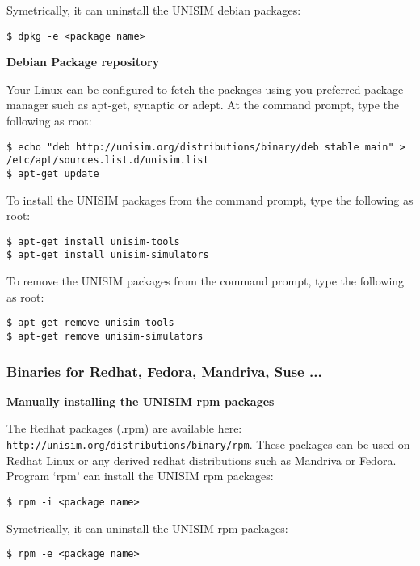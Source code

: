 Symetrically, it can uninstall the UNISIM debian packages:

\begin{verbatim}
$ dpkg -e <package name>
\end{verbatim}

\noindent \textbf{Debian Package repository}

Your Linux can be configured to fetch the packages using you preferred package manager such as apt-get, synaptic or adept.
At the command prompt, type the following as root:

\begin{verbatim}
$ echo "deb http://unisim.org/distributions/binary/deb stable main" > /etc/apt/sources.list.d/unisim.list
$ apt-get update
\end{verbatim}

To install the UNISIM packages from the command prompt, type the following as root:

\begin{verbatim}
$ apt-get install unisim-tools
$ apt-get install unisim-simulators
\end{verbatim}

To remove the UNISIM packages from the command prompt, type the following as root:

\begin{verbatim}
$ apt-get remove unisim-tools
$ apt-get remove unisim-simulators
\end{verbatim}

\subsubsection{Binaries for Redhat, Fedora, Mandriva, Suse ...}

\noindent \textbf{Manually installing the UNISIM rpm packages}

The Redhat packages (.rpm) are available here: \texttt{http://unisim.org/distributions/binary/rpm}.
These packages can be used on Redhat Linux or any derived redhat distributions such as Mandriva or Fedora.
Program ‘rpm’ can install the UNISIM rpm packages:

\begin{verbatim}
$ rpm -i <package name>
\end{verbatim}

Symetrically, it can uninstall the UNISIM rpm packages:

\begin{verbatim}
$ rpm -e <package name>
\end{verbatim}

